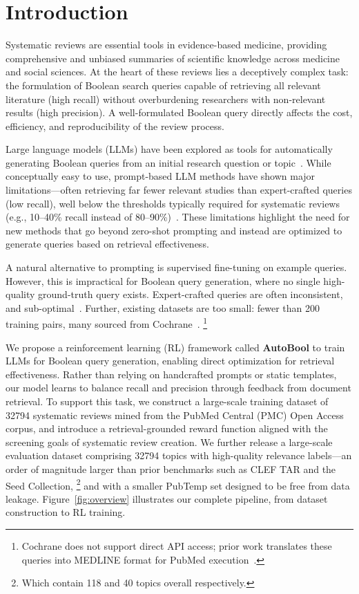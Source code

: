 \section{Introduction}
Systematic reviews are essential tools in evidence-based medicine, providing comprehensive and unbiased summaries of scientific knowledge across medicine and social sciences. At the heart of these reviews lies a deceptively complex task: the formulation of Boolean search queries capable of retrieving all relevant literature (high recall) without overburdening researchers with non-relevant results (high precision). A well-formulated Boolean query directly affects the cost, efficiency, and reproducibility of the review process.

Large language models (LLMs) have been explored as tools for automatically generating Boolean queries from an initial research question or topic~\cite{wang2023can, wang2025reassessing,staudinger2024reproducibility}. While conceptually easy to use, prompt-based LLM methods have shown major limitations---often retrieving far fewer relevant studies than expert-crafted queries (low recall), well below the thresholds typically required for systematic reviews (e.g., 10--40\% recall instead of 80--90\%)~\cite{wang2025reassessing}. These limitations highlight the need for new methods that go beyond zero-shot prompting and instead are optimized to generate queries based on retrieval effectiveness.

A natural alternative to prompting is supervised fine-tuning on example queries. However, this is impractical for Boolean query generation, where no single high-quality ground-truth query exists. Expert-crafted queries are often inconsistent, and sub-optimal~\cite{scells2018generating}. Further, existing datasets are too small: fewer than 200 training pairs, many sourced from Cochrane~\cite{kanoulas2018clef, wang2022seed}.%
\footnote{Cochrane does not support direct API access; prior work translates these queries into MEDLINE format for PubMed execution~\cite{wang2025reassessing}.}

We propose a reinforcement learning (RL) framework called \textbf{AutoBool} to train LLMs for Boolean query generation, enabling direct optimization for retrieval effectiveness. Rather than relying on handcrafted prompts or static templates, our model learns to balance recall and precision through feedback from document retrieval. To support this task, we construct a large-scale training dataset of \num{32794} systematic reviews mined from the PubMed Central (PMC) Open Access corpus, and introduce a retrieval-grounded reward function aligned with the screening goals of systematic review creation.
We further release a large-scale evaluation dataset comprising \num{32794} topics with high-quality relevance labels---an order of magnitude larger than prior benchmarks such as CLEF TAR and the Seed Collection,%
\footnote{Which contain 118 and 40 topics overall respectively.} 
and with a smaller PubTemp set designed to be free from data leakage. Figure~\ref{fig:overview} illustrates our complete pipeline, from dataset construction to RL training.

